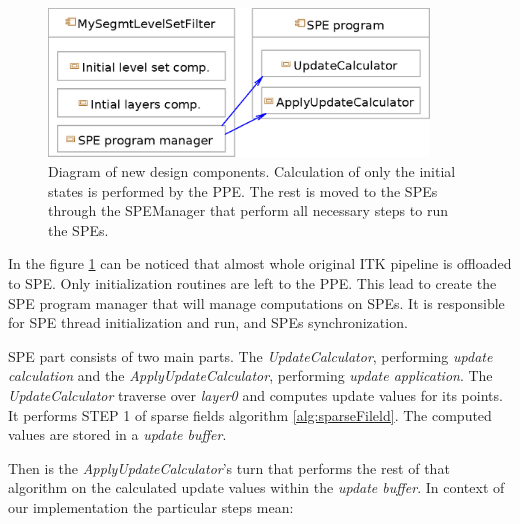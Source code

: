 \begin{figure}
    \centering
    \includegraphics[width=0.9\textwidth]{data/newDesign}
    \caption[Diagram of new design components]
{
Diagram of new design components. Calculation of only the initial states is performed by the PPE.
The rest is moved to the SPEs through the SPEManager that perform all necessary steps to run the SPEs.
}
\label{fg:newDesign}
\end{figure}

\par
In the figure \ref{fg:newDesign} can be noticed that almost whole original ITK pipeline is offloaded to SPE.
Only initialization routines are left to the PPE.
This lead to create the SPE program manager that will manage computations on SPEs.
It is responsible for SPE thread initialization and run, and SPEs synchronization.

\par
SPE part consists of two main parts.
The \mbox{\emph{UpdateCalculator}}, performing \emph{update calculation} and the \mbox{\emph{ApplyUpdateCalculator}}, performing \emph{update application}.
The \mbox{\emph{UpdateCalculator}} traverse over \emph{layer0} and computes update values for its points.
It performs STEP 1 of sparse fields algorithm \ref{alg:sparseFileld}.
The computed values are stored in a \emph{update buffer}.

\par
Then is the \mbox{\emph{ApplyUpdateCalculator}}'s turn that performs the rest of that algorithm on the calculated update values within the \emph{update buffer}.
In context of our implementation the particular steps mean:

